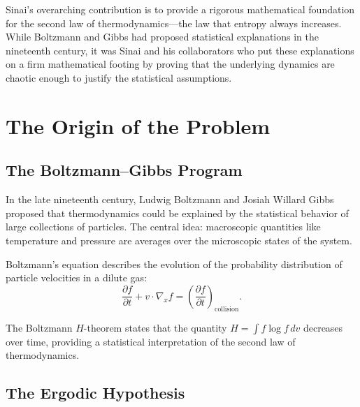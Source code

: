 Sinai's overarching contribution is to provide a rigorous mathematical foundation for the second law of thermodynamics---the law that entropy always increases. While Boltzmann and Gibbs had proposed statistical explanations in the nineteenth century, it was Sinai and his collaborators who put these explanations on a firm mathematical footing by proving that the underlying dynamics are chaotic enough to justify the statistical assumptions.


\begin{center}
\end{center}

\section{The Origin of the Problem}

\subsection{The Boltzmann--Gibbs Program}

In the late nineteenth century, Ludwig Boltzmann and Josiah Willard Gibbs proposed that thermodynamics could be explained by the statistical behavior of large collections of particles. The central idea: macroscopic quantities like temperature and pressure are averages over the microscopic states of the system.

Boltzmann's equation describes the evolution of the probability distribution of particle velocities in a dilute gas:
\[
\frac{\partial f}{\partial t} + v \cdot \nabla_x f = \left(\frac{\partial f}{\partial t}\right)_{\text{collision}}.
\]

The Boltzmann $H$-theorem states that the quantity $H = \int f \log f \, dv$ decreases over time, providing a statistical interpretation of the second law of thermodynamics.

\subsection{The Ergodic Hypothesis}

